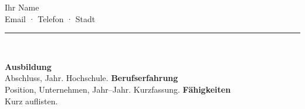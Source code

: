 \documentclass[11pt,a4paper]{article}
\begin{document}
\begin{center}
\vspace{0.5cm}
{\LARGE Ihr Name}\\[0.8em]
Email \quad · \quad Telefon \quad · \quad Stadt\\[0.6em]
\rule{1.8cm}{2.2cm}\\[0.6em]
\end{center}
\vspace{1em}
\textbf{Ausbildung}\\
Abschluss, Jahr. Hochschule.
\vspace{0.8em}
\textbf{Berufserfahrung}\\
Position, Unternehmen, Jahr--Jahr. Kurzfassung.
\vspace{0.8em}
\textbf{Fähigkeiten}\\
Kurz auflisten.
\end{document}
